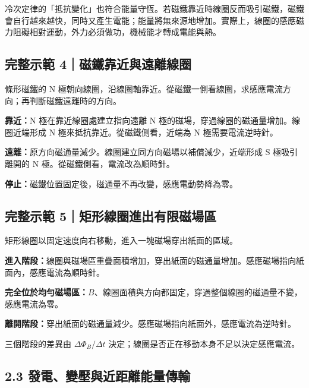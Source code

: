 \documentclass[11pt,a4paper]{article}
\begin{document}
冷次定律的「抵抗變化」也符合能量守恆。若磁鐵靠近時線圈反而吸引磁鐵，磁鐵會自行越來越快，同時又產生電能；能量將無來源地增加。實際上，線圈的感應磁力阻礙相對運動，外力必須做功，機械能才轉成電能與熱。

\begin{HandoutWorkedExample}

\subsection{完整示範 4｜磁鐵靠近與遠離線圈}\label{ux5b8cux6574ux793aux7bc4-4ux78c1ux9435ux9760ux8fd1ux8207ux9060ux96e2ux7ddaux5708}

條形磁鐵的 N 極朝向線圈，沿線圈軸靠近。從磁鐵一側看線圈，求感應電流方向；再判斷磁鐵遠離時的方向。

\textbf{靠近：}N 極在靠近線圈處建立指向遠離 N 極的磁場，穿過線圈的磁通量增加。線圈近端形成 N 極來抵抗靠近。從磁鐵側看，近端為 N 極需要電流逆時針。

\textbf{遠離：}原方向磁通量減少。線圈建立同方向磁場以補償減少，近端形成 S 極吸引離開的 N 極。從磁鐵側看，電流改為順時針。

\textbf{停止：}磁鐵位置固定後，磁通量不再改變，感應電動勢降為零。

\end{HandoutWorkedExample}

\begin{HandoutWorkedExample}

\subsection{完整示範 5｜矩形線圈進出有限磁場區}\label{ux5b8cux6574ux793aux7bc4-5ux77e9ux5f62ux7ddaux5708ux9032ux51faux6709ux9650ux78c1ux5834ux5340}

矩形線圈以固定速度向右移動，進入一塊磁場穿出紙面的區域。

\textbf{進入階段：}線圈與磁場區重疊面積增加，穿出紙面的磁通量增加。感應磁場指向紙面內，感應電流為順時針。

\textbf{完全位於均勻磁場區：}\(B\)、線圈面積與方向都固定，穿過整個線圈的磁通量不變，感應電流為零。

\textbf{離開階段：}穿出紙面的磁通量減少。感應磁場指向紙面外，感應電流為逆時針。

三個階段的差異由 \(\Delta\Phi_B/\Delta t\) 決定；線圈是否正在移動本身不足以決定感應電流。

\end{HandoutWorkedExample}

\subsection{2.3 發電、變壓與近距離能量傳輸}\label{ux767cux96fbux8b8aux58d3ux8207ux8fd1ux8dddux96e2ux80fdux91cfux50b3ux8f38}
\end{document}

